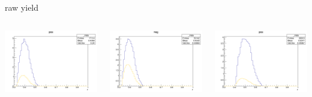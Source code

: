 \begin{frame}{raw yield}
\begin{columns}
\begin{column}[T]{0.25\textwidth}
\includegraphics[width = \textwidth]{results/yield/statistics/yield_x_Q2_z_0.65_5.500_0.40_pos.png}
\end{column}
\begin{column}[T]{0.25\textwidth}
\includegraphics[width = \textwidth]{results/yield/statistics/yield_x_Q2_z_0.65_5.500_0.40_neg.png}
\end{column}
\begin{column}[T]{0.25\textwidth}
\includegraphics[width = \textwidth]{results/yield/statistics/yield_x_Q2_z_0.65_5.500_0.50_pos.png}

\end{column}
\end{columns}
\end{frame}
